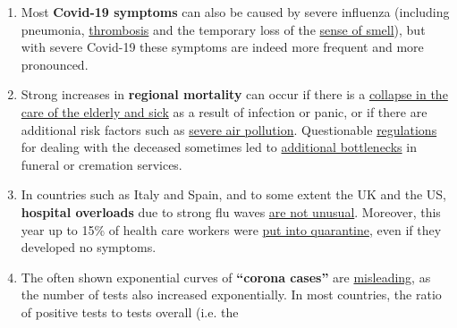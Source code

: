 \begin{enumerate}
{  not die} from Covid-19, they had already been
  \href{https://sports.yahoo.com/spanish-football-coach-francisco-garcia-163153573.html}{seriously
  ill} (e.g. from undiagnosed leukaemia), or they were in fact
  \href{https://www.n-tv.de/panorama/Neunjaehrige-Corona-Tote-war-109-Jahre-alt-article21753784.html}{109
  instead of 9} years old. The claimed increase in Kawasaki disease in
  children also turned out
  \href{https://www.societi.org.uk/kawasaki-disease-covid-19/responding-to-press-coverage-28-april-2020/}{to
  be exaggerated}.
\item
  Most \textbf{Covid-19 symptoms} can also be caused by severe influenza
  (including pneumonia,
  \href{https://www.sciencedaily.com/releases/2009/10/091014111549.htm}{thrombosis}
  and the temporary loss of the
  \href{https://pubmed.ncbi.nlm.nih.gov/23948436/}{sense of smell}), but
  with severe Covid-19 these symptoms are indeed more frequent and more
  pronounced.
\item
  Strong increases in \textbf{regional mortality} can occur if there is
  a \href{https://swprs.org/covid-19-a-report-from-italy/}{collapse in
  the care of the elderly and sick} as a result of infection or panic,
  or if there are additional risk factors such as
  \href{https://www.theguardian.com/environment/2020/apr/20/air-pollution-may-be-key-contributor-to-covid-19-deaths-study}{severe
  air pollution}. Questionable
  \href{https://www.ecdc.europa.eu/sites/default/files/documents/COVID-19-safe-handling-of-bodies-or-persons-dying-from-COVID19.pdf}{regulations}
  for dealing with the deceased sometimes led to
  \href{https://www.globalresearch.ca/truth-behind-refrigerated-morgue-truck-stories/5711475}{additional
  bottlenecks} in funeral or cremation services.
\item
  In countries such as Italy and Spain, and to some extent the UK and
  the US, \textbf{hospital overloads} due to strong flu waves
  \href{https://off-guardian.org/2020/04/02/coronavirus-fact-check-1-flu-doesnt-overwhelm-our-hospitals/}{are
  not unusual}. Moreover, this year up to 15\% of health care workers
  were
  \href{https://www.nytimes.com/2020/03/24/world/europe/coronavirus-europe-covid-19.html}{put
  into quarantine}, even if they developed no symptoms.
\item
  The often shown exponential curves of \textbf{``corona cases''} are
  \href{https://fivethirtyeight.com/features/coronavirus-case-counts-are-meaningless/}{misleading},
  as the number of tests also increased exponentially. In most
  countries, the ratio of positive tests to tests overall (i.e. the

\end{enumerate}
